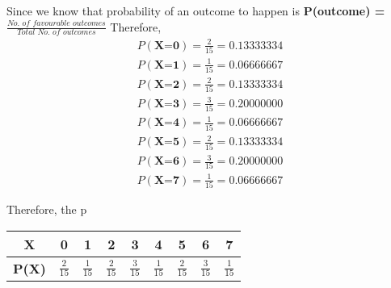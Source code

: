 \documentclass[journal,12pt,twocolumn]{IEEEtran}
\begin{document}
Since we know that probability of an outcome to happen is \textbf{P(outcome) = $\frac{\textit{No. of favourable outcomes}} {\textit{Total No. of outcomes}}$}
Therefore, 
\begin{align*}
    P(\textbf{X=0}) = \frac {2}{15} = 0.13333334
   \\ P(\textbf{X=1}) = \frac {1}{15} = 0.06666667
   \\ P(\textbf{X=2}) = \frac {2}{15} = 0.13333334
   \\ P(\textbf{X=3}) = \frac {3}{15} = 0.20000000
   \\P(\textbf{X=4}) = \frac {1}{15} = 0.06666667
   \\ P(\textbf{X=5}) = \frac {2}{15} = 0.13333334
   \\ P(\textbf{X=6}) = \frac {3}{15} = 0.20000000
   \\ P(\textbf{X=7}) = \frac {1}{15} = 0.06666667
\end{align*}

Therefore, the p
\begin{center}
\begin{tabular}{|c|c|c|c|c|c|c|c|c|}
\hline
\textbf{X} & 0 & 1 & 2 & 3 & 4 & 5 & 6 & 7 \\
\hline
\textbf{P(X)} & $\frac {2}{15}$ & $\frac {1}{15}$ & $\frac {2}{15}$ & $\frac {3}{15}$ & $\frac {1}{15}$ & $\frac {2}{15}$ & $\frac {3}{15}$ & $\frac {1}{15}$ \\
\hline 
\end{tabular}
\end{center}
\end{document}
